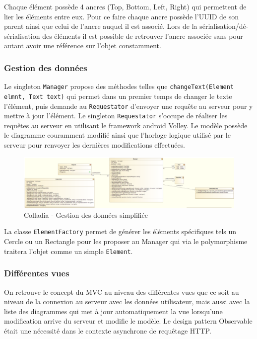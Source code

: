 Chaque élément possède 4 ancres (Top, Bottom, Left, Right) qui permettent de lier les éléments entre eux.
Pour ce faire chaque ancre possède l'UUID de son parent ainsi que celui de l'ancre auquel il est associé.
Lors de la sérialisation/dé-sérialisation des éléments il est possible de retrouver l'ancre associée sans pour autant avoir une référence sur l'objet constamment.
\vspace*{\fill}

\newpage
\subsubsection{Gestion des données}
Le singleton \lstinline$Manager$ propose des méthodes telles que \lstinline$changeText(Element elmnt, Text text)$ qui permet dans un premier temps de changer le texte l'élément, puis demande au \lstinline$Requestator$ d'envoyer une requête au serveur pour y mettre à jour l'élément.
Le singleton \lstinline$Requestator$ s'occupe de réaliser les requêtes au serveur en utilisant le framework android Volley.
Le modèle possède le diagramme couramment modifié ainsi que l'horloge logique utilisé par le serveur pour renvoyer les dernières modifications effectuées.

	\begin{figure}[!h]
		\centering
		\includegraphics[width=\textwidth]{img/UmlArchiGeneral}
		\caption{Colladia - Gestion des données simplifiée}
	\end{figure}
	
La classe \lstinline$ElementFactory$ permet de générer les éléments spécifiques tels un Cercle ou un Rectangle pour les proposer au Manager qui via le polymorphisme traitera l'objet comme un simple \lstinline$Element$.

\subsubsection{Différentes vues}
On retrouve le concept du MVC au niveau des différentes vues que ce soit au niveau de la connexion au serveur avec les données utilisateur, mais aussi avec la liste des diagrammes qui met à jour automatiquement la vue lorsqu'une modification arrive du serveur et modifie le modèle. Le design pattern Observable était une nécessité dans le contexte asynchrone de requêtage HTTP.

